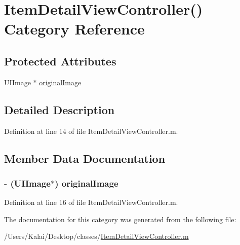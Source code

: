 \hypertarget{category_item_detail_view_controller_07_08}{\section{Item\-Detail\-View\-Controller() Category Reference}
\label{category_item_detail_view_controller_07_08}
}
\subsection*{Protected Attributes}
\begin{DoxyCompactItemize}
\item 
U\-I\-Image $\ast$ \hyperlink{category_item_detail_view_controller_07_08_a737df21b25c3018e72843f5fac5e0e36}{original\-Image}
\end{DoxyCompactItemize}


\subsection{Detailed Description}


Definition at line 14 of file Item\-Detail\-View\-Controller.\-m.



\subsection{Member Data Documentation}
\hypertarget{category_item_detail_view_controller_07_08_a737df21b25c3018e72843f5fac5e0e36}{
\subsubsection[{original\-Image}]{\setlength{\rightskip}{0pt plus 5cm}-\/ (U\-I\-Image$\ast$) original\-Image\hspace{0.3cm}{\ttfamily [protected]}}}\label{category_item_detail_view_controller_07_08_a737df21b25c3018e72843f5fac5e0e36}


Definition at line 16 of file Item\-Detail\-View\-Controller.\-m.



The documentation for this category was generated from the following file\-:\begin{DoxyCompactItemize}
\item 
/\-Users/\-Kalai/\-Desktop/classes/\hyperlink{_item_detail_view_controller_8m}{Item\-Detail\-View\-Controller.\-m}\end{DoxyCompactItemize}
